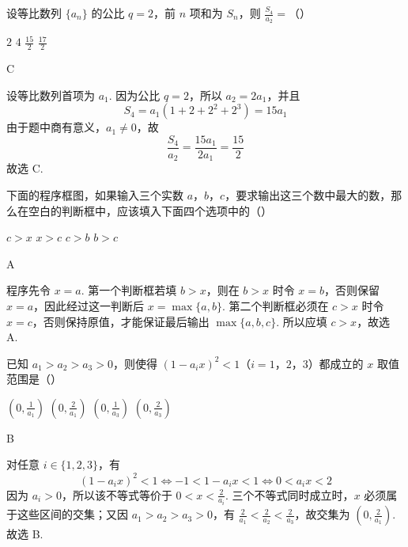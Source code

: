 \begin{problem}
设等比数列 \(\{a_{n}\}\) 的公比 \(q = 2\)，前 \(n\) 项和为 \(S_{n}\)，则 \(\frac{S_4}{a_2} =\)（\quad）

\choices
    {\(2\)}
    {\(4\)}
    {\(\frac{15}{2}\)}
    {\(\frac{17}{2}\)}
\begin{answer}
C
\end{answer}

\begin{solution}
设等比数列首项为 \(a_1\). 因为公比 \(q=2\)，所以 \(a_2=2a_1\)，并且
\[
S_4=a_1\left(1+2+2^2+2^3\right)=15a_1
\]
由于题中商有意义，\(a_1\ne0\)，故
\[
\frac{S_4}{a_2}=\frac{15a_1}{2a_1}=\frac{15}{2}
\]
故选 C.
\end{solution}
\end{problem}

\begin{problem}
下面的程序框图，如果输入三个实数 \(a\)，\(b\)，\(c\)，要求输出这三个数中最大的数，那么在空白的判断框中，应该填入下面四个选项中的（\quad）


\choices
    {\(c > x\)}
    {\(x > c\)}
    {\(c > b\)}
    {\(b > c\)}
\begin{answer}
A
\end{answer}

\begin{solution}
程序先令 \(x=a\). 第一个判断框若填 \(b>x\)，则在 \(b>x\) 时令 \(x=b\)，否则保留 \(x=a\)，因此经过这一判断后 \(x=\max\{a,b\}\). 第二个判断框必须在 \(c>x\) 时令 \(x=c\)，否则保持原值，才能保证最后输出 \(\max\{a,b,c\}\). 所以应填 \(c>x\)，故选 A.
\end{solution}
\end{problem}

\begin{problem}
已知 \(a_{1} > a_{2} > a_{3} > 0\)，则使得 \((1 - a_{i}x)^{2} < 1\)（\(i = 1\)，\(2\)，\(3\)）都成立的 \(x\) 取值范围是（\quad）

\choices
    {\(\left(0, \frac{1}{a_1}\right)\)}
    {\(\left(0, \frac{2}{a_1}\right)\)}
    {\(\left(0, \frac{1}{a_3}\right)\)}
    {\(\left(0, \frac{2}{a_3}\right)\)}
\begin{answer}
B
\end{answer}

\begin{solution}
对任意 \(i\in\{1,2,3\}\)，有
\[
\left(1-a_i x\right)^2<1
\Longleftrightarrow -1<1-a_i x<1
\Longleftrightarrow 0<a_i x<2
\]
因为 \(a_i>0\)，所以该不等式等价于 \(0<x<\frac{2}{a_i}\). 三个不等式同时成立时，\(x\) 必须属于这些区间的交集；又因 \(a_1>a_2>a_3>0\)，有 \(\frac{2}{a_1}<\frac{2}{a_2}<\frac{2}{a_3}\)，故交集为 \(\left(0,\frac{2}{a_1}\right)\). 故选 B.
\end{solution}
\end{problem}

